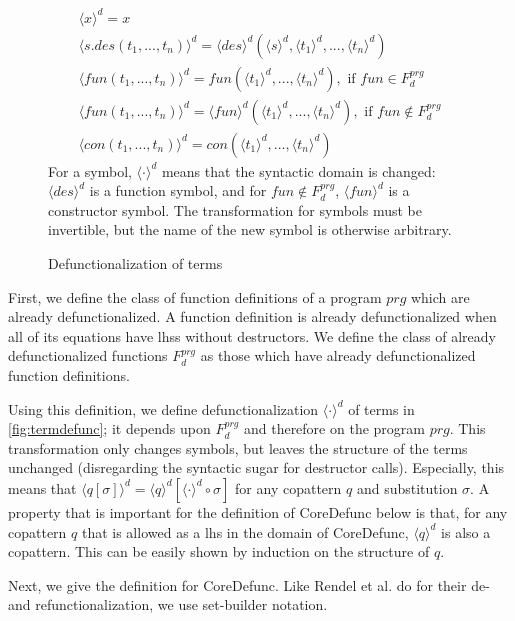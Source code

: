 \begin{figure}
\begin{align*}
\langle x \rangle^d = x \\
\langle s.des(t_1, ..., t_n) \rangle^d = \langle des \rangle^d (\langle s \rangle^d, \langle t_1 \rangle^d, ..., \langle t_n \rangle^d) \\
\langle fun(t_1, ..., t_n) \rangle^d = fun(\langle t_1 \rangle^d, ..., \langle t_n \rangle^d), \text{ if } fun \in F^{prg}_d \\
\langle fun(t_1, ..., t_n) \rangle^d = \langle fun \rangle^d (\langle t_1 \rangle^d, ..., \langle t_n \rangle^d), \text{ if } fun \not\in F^{prg}_d \\
\langle con(t_1, ..., t_n) \rangle^d = con(\langle t_1 \rangle^d, ..., \langle t_n \rangle^d)
\end{align*}
For a symbol, $\langle \cdot \rangle^d$ means that the syntactic domain is changed: $\langle des \rangle^d$ is a function symbol, and for $fun \not\in F^{prg}_d$, $\langle fun \rangle^d$ is a constructor symbol. The transformation for symbols must be invertible, but the name of the new symbol is otherwise arbitrary.
\caption{Defunctionalization of terms}
\label{fig:termdefunc}
\end{figure}

First, we define the class of function definitions of a program $prg$ which are already defunctionalized. A function definition is already defunctionalized when all of its equations have lhss without destructors. We define the class of already defunctionalized functions $F^{prg}_d$ as those which have already defunctionalized function definitions.

Using this definition, we define defunctionalization $\langle \cdot \rangle^d$ of terms in \autoref{fig:termdefunc}; it depends upon $F^{prg}_d$ and therefore on the program $prg$. This transformation only changes symbols, but leaves the structure of the terms unchanged (disregarding the syntactic sugar for destructor calls). Especially, this means that $\langle q[\sigma] \rangle^d = \langle q \rangle^d [\langle \cdot \rangle^d \circ \sigma]$ for any copattern $q$ and substitution $\sigma$. A property that is important for the definition of \textsf{CoreDefunc} below is that, for any copattern $q$ that is allowed as a lhs in the domain of \textsf{CoreDefunc}, $\langle q \rangle^d$ is also a copattern. This can be easily shown by induction on the structure of $q$.

Next, we give the definition for \textsf{CoreDefunc}. Like Rendel et al. do for their de- and refunctionalization, we use set-builder notation.

